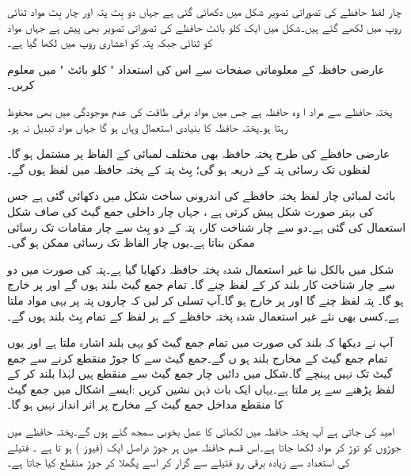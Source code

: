 چار لفظ حافظے کی تصوراتی تصویر شکل  میں دکھائی گئی ہے جہاں دو بِٹ پتہ اور چار بِٹ مواد ثنائی روپ میں لکھے گئے ہیں۔شکل میں ایک کلو بائٹ حافظے کی تصوراتی تصویر بھی پیش ہے جہاں مواد کو ثنائی جبکہ پتہ کو اعشاری روپ میں لکھا گیا ہے۔

عارضی حافظہ کے معلوماتی صفحات سے اس کی استعداد " کلو بائٹ " میں معلوم کریں۔



پختہ حافظے سے مراد ا وہ حافظہ ہے جس میں مواد برقی طاقت کی عدم موجودگی میں بھی محفوظ رہتا ہو۔پختہ حافظہ کا بنیادی استعمال وہاں ہو گا جہاں مواد تبدیل نہ ہو۔

عارضی حافظے کی طرح پختہ حافظہ بھی مختلف لمبائی کے الفاظ پر مشتمل ہو گا۔لفظوں تک رسائی پتہ کے ذریعہ ہو گی؛  بِٹ پتہ کے پختہ حافظہ میں  لفظ ہوں گے۔

بائٹ لمبائی چار لفظ پختہ حافظے کی اندرونی ساخت شکل  میں دکھائی گئی ہے جس کی بہتر صورت شکل  پیش کرتی ہے ، جہاں چار داخلی جمع گیٹ کی صاف شکل استعمال کی گئی ہے۔دو سے چار شناخت کار، پتہ کے دو بِٹ سے چار مقامات تک رسائی ممکن بناتا ہے۔یوں چار الفاظ تک رسائی ممکن ہو گی۔



شکل  میں بالکل نیا غیر استعمال شدہ پختہ حافظہ دکھایا گیا ہے۔پتہ  کی صورت میں دو سے چار شناخت کار  بلند کر کے لفظ  چنے گا۔ تمام جمع گیٹ بلند ہوں گے اور  پر  خارج ہو گا۔ پتہ  لفظ  چنے گا اور  پر  خارج ہو گا۔آپ تسلی کر لیں کہ چاروں پتہ پر یہی مواد ملتا ہے۔کسی بھی نئے غیر استعمال شدہ پختہ حافظے کے ہر لفظ کے تمام بِٹ بلند  ہوں گے۔


آپ نے دیکھا کہ بلند  کی صورت میں تمام جمع گیٹ کو یہی بلند اشارہ ملتا ہے اور یوں تمام جمع گیٹ کے مخارج بلند ہو ں گے۔جمع گیٹ سے  کا جوڑ منقطع کرنے سے  جمع گیٹ تک نہیں پہنچے گا۔شکل  میں دائیں چار جمع گیٹ  سے منقطع ہیں لہٰذا  بلند کر کے لفظ  پڑھنے سے  پر  ملتا ہے۔یہاں ایک بات ذہن نشین کریں :ایسے اشکال میں جمع گیٹ کا منقطع مداخل جمع گیٹ کے مخارج پر اثر انداز نہیں ہو گا۔

امید کی جاتی ہے آپ پختہ حافظہ میں لکھائی کا عمل بخوبی سمجھ گئے ہوں گے۔پختہ حافظے میں جوڑوں کو توڑ کر مواد لکھا جاتا ہے۔اس قسم حافظہ میں ہر جوڑ دراصل ایک (فیوز ) ہو تا ہے ۔ فتیلے کی استعداد سے زیادہ برقی رو فتیلے سے گزار کر اسے پگھلا کر جوڑ منقطع کیا جاتا ہے۔


